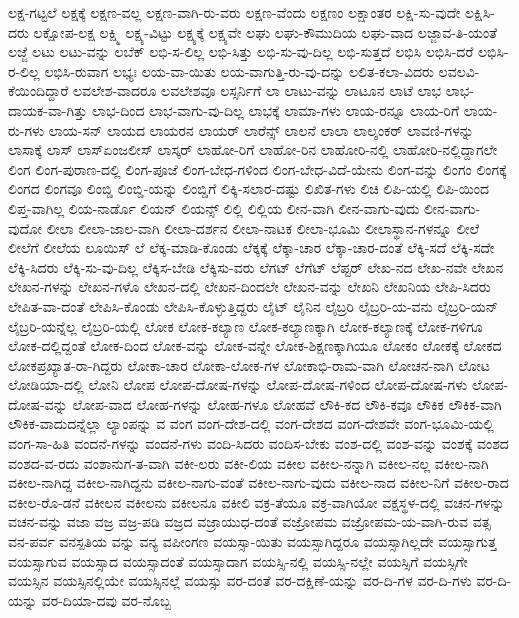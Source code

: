 {ಲಕ್ಷ-ಗಟ್ಟಲೆ
ಲಕ್ಷಕ್ಕೆ
ಲಕ್ಷಣ-ವಲ್ಲ
ಲಕ್ಷಣ-ವಾಗಿ-ರು-ವರು
ಲಕ್ಷಣ-ವೆಂದು
ಲಕ್ಷಣಂ
ಲಕ್ಷಾಂತರ
ಲಕ್ಷಿ-ಸು-ವುದೇ
ಲಕ್ಷಿಸಿ-ದರು
ಲಕ್ಷೋಪ-ಲಕ್ಷ
ಲಕ್ಷ್ಮಿ
ಲಕ್ಷ್ಯ-ವಿಟ್ಟು
ಲಕ್ಷ್ಯಕ್ಕೆ
ಲಕ್ಷ್ಯವೇ
ಲಘು
ಲಘು-ಕೌಮುದಿಯ
ಲಘು-ವಾದ
ಲಜ್ಜಾವ-ತಿ-ಯಂತೆ
ಲಜ್ಜೆ
ಲಟು
ಲಟು-ವನ್ನು
ಲಬೆಕ್
ಲಭಿ-ಸ-ಲಿಲ್ಲ
ಲಭಿ-ಸಿತ್ತು
ಲಭಿ-ಸು-ವು-ದಿಲ್ಲ
ಲಭಿ-ಸುತ್ತದೆ
ಲಭಿಸಿ
ಲಭಿಸಿ-ದರೆ
ಲಭಿಸಿ-ರ-ಲಿಲ್ಲ
ಲಭಿಸಿ-ರುವಾಗ
ಲಭ್ಯಃ
ಲಯ-ವಾ-ಯಿತು
ಲಯ-ವಾಗುತ್ತಿ-ರು-ವು-ದನ್ನು
ಲಲಿತ-ಕಲಾ-ವಿದರು
ಲವಲವಿ-ಕೆಯಿಂದಿದ್ದಾರೆ
ಲವಲೇಶ-ವಾದರೂ
ಲವಲೇಶವೂ
ಲಸ್ಸರ್ನಿಗೆ
ಲಾ
ಲಾಟು-ವನ್ನು
ಲಾಟೂನ
ಲಾಟೆ
ಲಾಭ
ಲಾಭ-ದಾಯಕ-ವಾ-ಗಿತ್ತು
ಲಾಭ-ದಿಂದ
ಲಾಭ-ವಾಗು-ವು-ದಿಲ್ಲ
ಲಾಭಕ್ಕೆ
ಲಾಮಾ-ಗಳು
ಲಾಯ-ರನ್ನೂ
ಲಾಯ-ರಿಗೆ
ಲಾಯ-ರು-ಗಳು
ಲಾಯ-ಸನ್
ಲಾಯದ
ಲಾಯರನ
ಲಾಯರ್
ಲಾರೆನ್ಸ್
ಲಾಲನೆ
ಲಾಲಾ
ಲಾಲ್ಶಂಕರ್
ಲಾವಣಿ-ಗಳನ್ನು
ಲಾಸಾಕ್ಕೆ
ಲಾಸ್
ಲಾಸ್ಏಂಜಲೀಸ್
ಲಾಸ್ಕರ್
ಲಾಹೋ-ರಿಗೆ
ಲಾಹೋ-ರಿನ
ಲಾಹೋರಿ-ನಲ್ಲಿ
ಲಾಹೋರಿ-ನಲ್ಲಿದ್ದಾಗಲೇ
ಲಿಂಗ
ಲಿಂಗ-ಪುರಾಣ-ದಲ್ಲಿ
ಲಿಂಗ-ಪೂಜೆ
ಲಿಂಗ-ಬೇಧ-ಗಳಿಂದ
ಲಿಂಗ-ಬೇಧ-ವಿದೆ-ಯೇನು
ಲಿಂಗ-ವನ್ನು
ಲಿಂಗಂ
ಲಿಂಗಕ್ಕೆ
ಲಿಂಗದ
ಲಿಂಗವೂ
ಲಿಂಬ್ಡಿ
ಲಿಂಬ್ಡಿ-ಯನ್ನು
ಲಿಂಬ್ಡಿಗೆ
ಲಿಕ್ಕಿ-ಸಲಾರ-ದಷ್ಟು
ಲಿಖಿತ-ಗಳು
ಲಿಚಿ
ಲಿಪಿ-ಯಲ್ಲಿ
ಲಿಪಿ-ಯಿಂದ
ಲಿಪ್ತ-ವಾಗಿಲ್ಲ
ಲಿಯ-ನಾರ್ಡೊ
ಲಿಯನ್
ಲಿಯನ್ಸ್
ಲಿಲ್ಲಿ
ಲಿಲ್ಲಿಯ
ಲೀನ-ವಾಗಿ
ಲೀನ-ವಾಗು-ವುದು
ಲೀನ-ವಾಗು-ವುದೋ
ಲೀಲಾ
ಲೀಲಾ-ಜಾಲ-ವಾಗಿ
ಲೀಲಾ-ದರ್ಶನ
ಲೀಲಾ-ನಾಟಕ
ಲೀಲಾ-ಭೂಮಿ
ಲೀಲಾಸ್ಥಾನ-ಗಳನ್ನೂ
ಲೀಲೆ
ಲೀಲೆಗೆ
ಲೀಲೆಯ
ಲೂಯಿಸ್
ಲೆ
ಲೆಕ್ಕ-ಮಾಡಿ-ಕೊಂಡು
ಲೆಕ್ಕಕ್ಕೆ
ಲೆಕ್ಕಾ-ಚಾರ
ಲೆಕ್ಕಾ-ಚಾರ-ದಂತೆ
ಲೆಕ್ಕಿ-ಸದೆ
ಲೆಕ್ಕಿ-ಸದೇ
ಲೆಕ್ಕಿ-ಸಿದರು
ಲೆಕ್ಕಿ-ಸು-ವು-ದಿಲ್ಲ
ಲೆಕ್ಕಿಸ-ಬೇಡಿ
ಲೆಕ್ಕಿಸು-ವರು
ಲೆಗಟ್
ಲೆಗೆಟ್
ಲೆಪ್ಟರ್
ಲೇಖ-ನದ
ಲೇಖ-ನವೇ
ಲೇಖನ
ಲೇಖನ-ಗಳನ್ನು
ಲೇಖನ-ಗಳೊ
ಲೇಖನ-ದಲ್ಲಿ
ಲೇಖನ-ದಿಂದಲೇ
ಲೇಖನ-ವನ್ನು
ಲೇಖನಿ
ಲೇಖನಿಯ
ಲೇಪಿ-ಸಿದರು
ಲೇಪಿತ-ವಾ-ದಂತೆ
ಲೇಪಿಸಿ-ಕೊಂಡು
ಲೇಪಿಸಿ-ಕೊಳ್ಳುತ್ತಿದ್ದರು
ಲೈಟ್
ಲೈನಿನ
ಲೈಬ್ರರಿ
ಲೈಬ್ರರಿ-ಯ-ವನು
ಲೈಬ್ರರಿ-ಯನ್
ಲೈಬ್ರರಿ-ಯನ್ನೆಲ್ಲ
ಲೈಬ್ರರಿ-ಯಲ್ಲಿ
ಲೋಕ
ಲೋಕ-ಕಲ್ಯಾಣ
ಲೋಕ-ಕಲ್ಯಾಣಕ್ಕಾಗಿ
ಲೋಕ-ಕಲ್ಯಾಣಕ್ಕೆ
ಲೋಕ-ಗಳಿಗೂ
ಲೋಕ-ದಲ್ಲಿದ್ದಂತೆ
ಲೋಕ-ದಿಂದ
ಲೋಕ-ವನ್ನು
ಲೋಕ-ವನ್ನೇ
ಲೋಕ-ಶಿಕ್ಷಣಕ್ಕಾಗಿಯೂ
ಲೋಕಂ
ಲೋಕಕ್ಕೆ
ಲೋಕದ
ಲೋಕಪ್ರಖ್ಯಾತ-ರಾ-ಗಿದ್ದರು
ಲೋಕಾ-ಚಾರ
ಲೋಕಾ-ಲೋಕ-ಗಳ
ಲೋಕಾಭಿ-ರಾಮ-ವಾಗಿ
ಲೋಚನ-ನಾಗಿ
ಲೋಟ
ಲೋಡಿಯಾ-ದಲ್ಲಿ
ಲೋನಿ
ಲೋಪ
ಲೋಪ-ದೋಷ-ಗಳನ್ನು
ಲೋಪ-ದೋಷ-ಗಳಿಂದ
ಲೋಪ-ದೋಷ-ಗಳು
ಲೋಪ-ದೋಷ-ವನ್ನು
ಲೋಪ-ವಾದ
ಲೋಹ-ಗಳನ್ನು
ಲೋಹ-ಗಳೂ
ಲೋಹವೆ
ಲೌಕಿ-ಕದ
ಲೌಕಿ-ಕವೂ
ಲೌಕಿಕ
ಲೌಕಿಕ-ವಾಗಿ
ಲೌಕಿಕ-ವಾದುದನ್ನೆಲ್ಲಾ
ಲ್ಯಾಂಪನ್ನು
ವ
ವಂಗ
ವಂಗ-ದೇಶ-ದಲ್ಲಿ
ವಂಗ-ದೇಶದ
ವಂಗ-ದೇಶವೇ
ವಂಗ-ಭೂಮಿ-ಯಲ್ಲಿ
ವಂಗ-ಸಾ-ಹಿತಿ
ವಂದನೆ-ಗಳನ್ನು
ವಂದನೆ-ಗಳು
ವಂದಿ-ಸಿದರು
ವಂದಿಸ-ಬೇಕು
ವಂಶ-ದಲ್ಲಿ
ವಂಶ-ವನ್ನು
ವಂಶಕ್ಕೆ
ವಂಶದ
ವಂಶದ-ವ-ರದು
ವಂಶಾನುಗ-ತ-ವಾಗಿ
ವಕೀ-ಲರು
ವಕೀ-ಲಿಯ
ವಕೀಲ
ವಕೀಲ-ನನ್ನಾಗಿ
ವಕೀಲ-ನಲ್ಲ
ವಕೀಲ-ನಾಗಿ
ವಕೀಲ-ನಾಗಿದ್ದ
ವಕೀಲ-ನಾಗಿದ್ದನು
ವಕೀಲ-ನಾಗು-ವಂತೆ
ವಕೀಲ-ನಾಗು-ವುದು
ವಕೀಲ-ನಾದ
ವಕೀಲ-ನಿಗೆ
ವಕೀಲ-ರಾದ
ವಕೀಲ-ರೊ-ಡನೆ
ವಕೀಲನ
ವಕೀಲನು
ವಕೀಲನೂ
ವಕೀಲಿ
ವಕ್ರ-ತೆಯೂ
ವಕ್ರ-ವಾಗಿಯೋ
ವಕ್ಷಸ್ಥಳ-ದಲ್ಲಿ
ವಚನ-ಗಳನ್ನು
ವಚನ-ವನ್ನು
ವಜಾ
ವಜ್ರ
ವಜ್ರ-ಪಡಿ
ವಜ್ರದ
ವಜ್ರಾಯುಧ-ದಂತೆ
ವಜ್ರೋಪಮ
ವಜ್ರೋಪಮ-ಯ-ವಾಗಿ-ರುವ
ವತ್ಸ
ವನ-ಪರ್ವ
ವನಸ್ಪತಿಯ
ವನ್ನು
ವನ್ಯ
ವಪೀಂಗಣ
ವಯಸ್ಸಾ-ಯಿತು
ವಯಸ್ಸಾಗಿದ್ದರೂ
ವಯಸ್ಸಾಗಿಲ್ಲದೇ
ವಯಸ್ಸಾಗುತ್ತ
ವಯಸ್ಸಾಗುವ
ವಯಸ್ಸಾದ
ವಯಸ್ಸಾದಂತೆ
ವಯಸ್ಸಾದಾಗ
ವಯಸ್ಸಿ-ನಲ್ಲಿ
ವಯಸ್ಸಿ-ನಲ್ಲೇ
ವಯಸ್ಸಿಗೆ
ವಯಸ್ಸಿಗೇ
ವಯಸ್ಸಿನ
ವಯಸ್ಸಿನಲ್ಲಿಯೇ
ವಯಸ್ಸಿನಲ್ಲೆ
ವಯಸ್ಸು
ವರ-ದಂತೆ
ವರ-ದಕ್ಷಿಣೆ-ಯನ್ನು
ವರ-ದಿ-ಗಳ
ವರ-ದಿ-ಗಳು
ವರ-ದಿ-ಯನ್ನು
ವರ-ದಿಯಾ-ದವು
ವರ-ನೊಬ್ಬ
}

